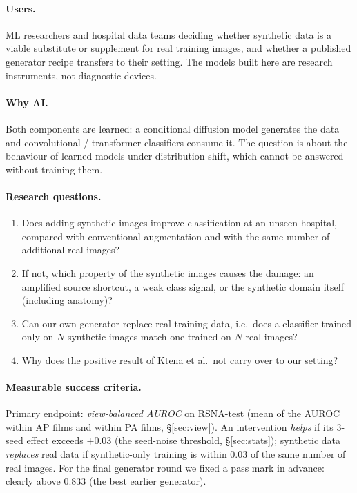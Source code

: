 \documentclass[11pt,a4paper]{article}
\begin{document}
\paragraph{Users.} ML researchers and hospital data teams deciding whether synthetic data is a viable substitute or supplement for real training images, and whether a published generator recipe transfers to their setting. The models built here are research instruments, not diagnostic devices.

\paragraph{Why AI.} Both components are learned: a conditional diffusion model generates the data and convolutional / transformer classifiers consume it. The question is about the behaviour of learned models under distribution shift, which cannot be answered without training them.

\paragraph{Research questions.}
\begin{enumerate}
\item[RQ1] Does adding synthetic images improve classification at an unseen hospital, compared with conventional augmentation and with the same number of additional real images?
\item[RQ2] If not, which property of the synthetic images causes the damage: an amplified source shortcut, a weak class signal, or the synthetic domain itself (including anatomy)?
\item[RQ3] Can our own generator replace real training data, i.e.\ does a classifier trained only on $N$ synthetic images match one trained on $N$ real images?
\item[RQ4] Why does the positive result of Ktena et al.\ not carry over to our setting?
\end{enumerate}

\paragraph{Measurable success criteria.} Primary endpoint: \emph{view-balanced AUROC} on RSNA-test (mean of the AUROC within AP films and within PA films, \S\ref{sec:view}). An intervention \emph{helps} if its 3-seed effect exceeds $+0.03$ (the seed-noise threshold, \S\ref{sec:stats}); synthetic data \emph{replaces} real data if synthetic-only training is within $0.03$ of the same number of real images. For the final generator round we fixed a pass mark in advance: clearly above 0.833 (the best earlier generator).
\end{document}
